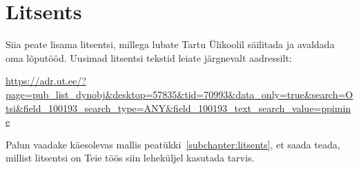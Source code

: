 \section*{Litsents} \label{litsents} 
Siia peate lisama litsentsi, millega lubate Tartu Ülikoolil säilitada ja avaldada oma lõputööd. Uusimad litsentsi tekstid leiate järgnevalt aadressilt:

\url{https://adr.ut.ee/?page=pub_list_dynobj&desktop=57835&tid=70993&data_only=true&search=Otsi&field_100193_search_type=ANY&field_100193_text_search_value=ppimine}

Palun vaadake käesolevas mallis peatükki~\ref{subchapter:litsents}, et saada teada, millist litsentsi on Teie töös siin leheküljel kasutada tarvis.